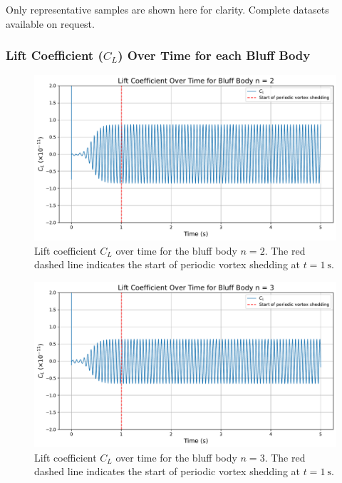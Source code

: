 \vspace{1em}

\begin{tcolorbox}[width=\textwidth, height=2.3cm, colframe=black, boxrule=0.5pt, sharp corners]
	\vspace{0.6em}
	Only representative samples are shown here for clarity. Complete datasets available on request. 
\end{tcolorbox}

\subsubsection{Lift Coefficient ($C_L$) Over Time for each Bluff Body}
\label{sec:C_LvsTime}

\begin{figure}[H]
	\centering
	\includegraphics[width=\textwidth]{images/2face_graph}
	\caption{Lift coefficient $C_L$ over time for the bluff body $n=2$. The red dashed line indicates the start of periodic vortex shedding at $t = \SI{1}{\second}$.}
	\label{fig:2FaceGraph}
\end{figure}

\begin{figure}[H]
	\centering
	\includegraphics[width=\textwidth]{images/3face_graph}
	\caption{Lift coefficient $C_L$ over time for the bluff body $n=3$. The red dashed line indicates the start of periodic vortex shedding at $t = \SI{1}{\second}$.}
	\label{fig:3FaceGraph} 
\end{figure}

